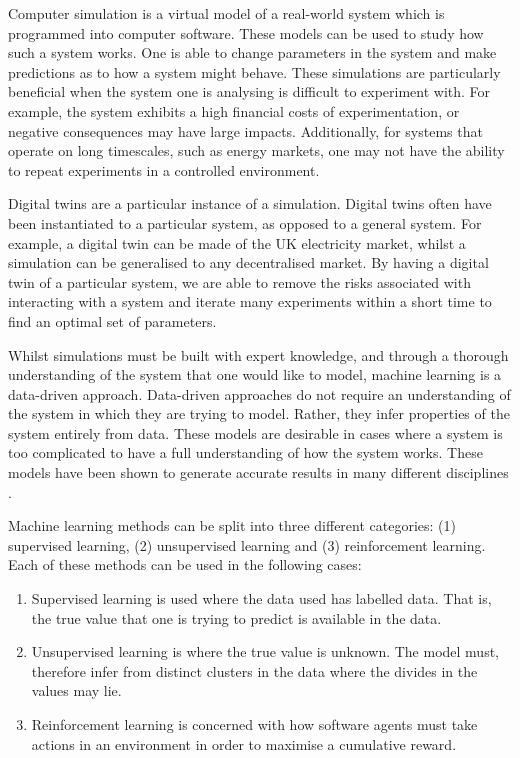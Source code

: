 Computer simulation is a virtual model of a real-world system which is programmed into computer software. These models can be used to study how such a system works. One is able to change parameters in the system and make predictions as to how a system might behave. These simulations are particularly beneficial when the system one is analysing is difficult to experiment with. For example, the system exhibits a high financial costs of experimentation, or negative consequences may have large impacts. Additionally, for systems that operate on long timescales, such as energy markets, one may not have the ability to repeat experiments in a controlled environment.

Digital twins are a particular instance of a simulation. Digital twins often have been instantiated to a particular system, as opposed to a general system. For example, a digital twin can be made of the UK electricity market, whilst a simulation can be generalised to any decentralised market. By having a digital twin of a particular system, we are able to remove the risks associated with interacting with a system and iterate many experiments within a short time to find an optimal set of parameters. 

Whilst simulations must be built with expert knowledge, and through a thorough understanding of the system that one would like to model, machine learning is a data-driven approach. Data-driven approaches do not require an understanding of the system in which they are trying to model. Rather, they infer properties of the system entirely from data. These models are desirable in cases where a system is too complicated to have a full understanding of how the system works. These models have been shown to generate accurate results in many different disciplines \cite{WarrenLiao2005,Wiens2009,Covington2016}.

Machine learning methods can be split into three different categories: (1) supervised learning, (2) unsupervised learning and (3) reinforcement learning. Each of these methods can be used in the following cases:

\begin{enumerate}
	\item Supervised learning is used where the data used has labelled data. That is, the true value that one is trying to predict is available in the data.
	\item Unsupervised learning is where the true value is unknown. The model must, therefore infer from distinct clusters in the data where the divides in the values may lie.
	\item Reinforcement learning is concerned with how software agents must take actions in an environment in order to maximise a cumulative reward.
\end{enumerate}

